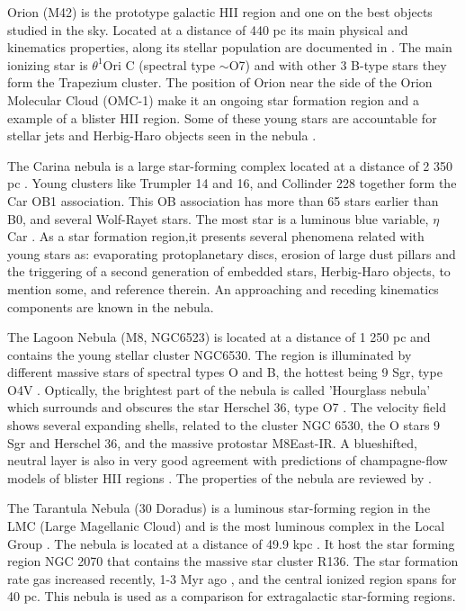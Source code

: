 \documentclass[fleqn,usenatbib, useAMS, a4paper]{mnras}
\begin{document}
Orion (M42) is the prototype galactic HII region and one on the best objects studied in the sky.
Located at a distance of 440 pc \citep{2008AJ....136.1566O} its main physical and kinematics properties, along its stellar population are documented in \citet{2001ARA&A..39...99O}.
The main ionizing star is \(\theta^{1}\)Ori C (spectral type \(\sim\)O7) and with other 3 B-type stars they form the Trapezium cluster.
The position of Orion near the side of the Orion Molecular Cloud (OMC-1) make it an ongoing star formation region and a example of a blister HII region. Some of these young stars are accountable for stellar jets and Herbig-Haro objects seen in the nebula \citep{arthur2016turbulence}.

The Carina nebula is a large star-forming complex located at a distance of 2 350 pc \citep{2006ApJ...644.1151S}.
Young clusters like Trumpler 14 and 16, and Collinder 228 together form the Car OB1 association.
This OB association has more than 65 stars earlier than B0, and several Wolf-Rayet stars.
The most star is a luminous blue variable, $\eta$ Car \citep{Damiani:2016a}.
As a star formation region,it presents several phenomena related with young stars as: evaporating protoplanetary discs, erosion of large dust pillars and the triggering of a second generation of embedded stars, Herbig-Haro objects, to mention some, \citet{2008hsf2.book..138S} and reference therein.
An approaching and receding kinematics components are known in the nebula.

The Lagoon Nebula (M8, NGC6523) is located at a distance of 1 250 pc \citep{2005A&A...430..941P} and contains the young stellar cluster NGC6530.
The region is illuminated by different massive stars of spectral types O and B, the hottest being 9 Sgr, type O4V \citep{Damiani:2017b}.
Optically, the brightest part of the nebula is called 'Hourglass nebula' which surrounds and obscures the star Herschel 36, type O7 \citep{1986AJ.....91..870W}. 
The velocity field shows several expanding shells, related to the cluster NGC 6530, the O stars 9 Sgr and Herschel 36, and the massive protostar M8East-IR. A blueshifted, neutral layer is also in very good agreement with predictions of champagne-flow models of blister HII regions \citep{Damiani:2017b}. The properties of the nebula are reviewed by \citet{2008hsf2.book..533T}.

The Tarantula Nebula (30 Doradus) is a luminous star-forming region in the LMC (Large Magellanic Cloud) and is the most luminous complex in the Local Group \citep{1984ApJ...287..116K}. The nebula is located at a distance of 49.9 kpc \citep{2013Natur.495...76P}.
It host the star forming region NGC 2070 that contains the massive star cluster R136. 
The star formation rate gas increased recently, 1-3 Myr ago \citep{2016ApJ...833..154C}, and the central ionized region spans for 40 pc.
This nebula is used as a comparison for extragalactic star-forming regions.
\end{document}
